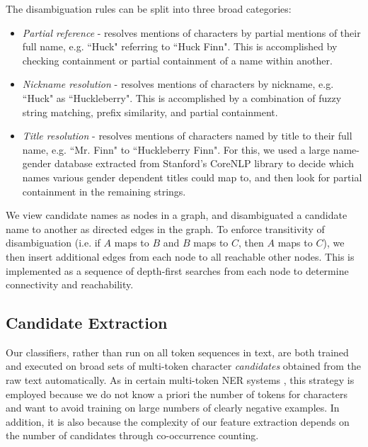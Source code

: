 \documentclass[12pt]{article}
\begin{document}
        The disambiguation rules can be split into three broad categories:
        \begin{itemize}
            \item \emph{Partial reference} - resolves mentions of characters by partial mentions of their full
            name, e.g. ``Huck" referring to ``Huck Finn".  This is accomplished by checking containment or partial
            containment of a name within another.

            \item \emph{Nickname resolution} - resolves mentions of characters by nickname, e.g. ``Huck" as
            ``Huckleberry".  This is accomplished by a combination of fuzzy string matching, prefix similarity, and
            partial containment.

            \item \emph{Title resolution} - resolves mentions of characters named by title to their full name, e.g.
            ``Mr. Finn" to ``Huckleberry Finn".  For this, we used a large name-gender database extracted from
            Stanford's CoreNLP library to decide which names various gender dependent titles could map to, and then
            look for partial containment in the remaining strings.
        \end{itemize}

        We view candidate names as nodes in a graph, and disambiguated a candidate name to another as directed edges
        in the graph.  To enforce transitivity of disambiguation (i.e. if $A$ maps to $B$ and $B$ maps to $C$, then $A$
        maps to $C$), we then insert additional edges from each node to all reachable other nodes.  This is implemented
        as a sequence of depth-first searches from each node to determine connectivity and reachability.

    \subsection{Candidate Extraction}

        Our classifiers, rather than run on all token sequences in text, are both trained and executed on
        broad sets of multi-token character \emph{candidates} obtained from the raw text automatically. 
        As in certain multi-token NER systems \cite{da2004cluster}, this strategy is employed because we do not
        know a priori the number of tokens for characters and want to avoid training on large numbers
        of clearly negative examples. In addition, it is also because the complexity of our feature extraction 
        depends on the number of candidates through co-occurrence counting. \\
\end{document}
